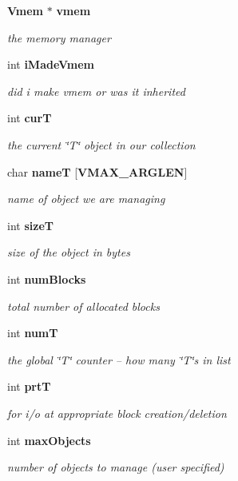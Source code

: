 \begin{DoxyCompactItemize}
\item 
{\bf Vmem} $\ast$ {\bf vmem}
\begin{DoxyCompactList}\small\item\em the memory manager \end{DoxyCompactList}\item 
int {\bf i\-Made\-Vmem}
\begin{DoxyCompactList}\small\item\em did i make vmem or was it inherited \end{DoxyCompactList}\item 
int {\bf cur\-T}
\begin{DoxyCompactList}\small\item\em the current \char`\"{}\-T\char`\"{} object in our collection \end{DoxyCompactList}\item 
char {\bf name\-T} [{\bf V\-M\-A\-X\-\_\-\-A\-R\-G\-L\-E\-N}]
\begin{DoxyCompactList}\small\item\em name of object we are managing \end{DoxyCompactList}\item 
int {\bf size\-T}
\begin{DoxyCompactList}\small\item\em size of the object in bytes \end{DoxyCompactList}\item 
int {\bf num\-Blocks}
\begin{DoxyCompactList}\small\item\em total number of allocated blocks \end{DoxyCompactList}\item 
int {\bf num\-T}
\begin{DoxyCompactList}\small\item\em the global \char`\"{}\-T\char`\"{} counter -- how many \char`\"{}\-T\char`\"{}s in list \end{DoxyCompactList}\item 
int {\bf prt\-T}
\begin{DoxyCompactList}\small\item\em for i/o at appropriate block creation/deletion \end{DoxyCompactList}\item 
int {\bf max\-Objects}
\begin{DoxyCompactList}\small\item\em number of objects to manage (user specified) \end{DoxyCompactList}\item 

\end{DoxyCompactItemize}
